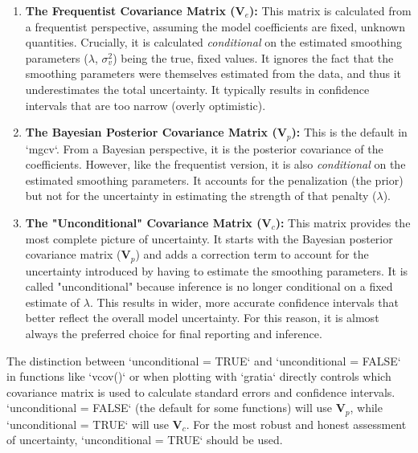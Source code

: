 \documentclass[11pt, a4paper]{article}
\begin{document}
\begin{enumerate}
    \item \textbf{The Frequentist Covariance Matrix ($\mathbf{V}_e$):} This matrix is calculated from a frequentist perspective, assuming the model coefficients are fixed, unknown quantities. Crucially, it is calculated \textit{conditional} on the estimated smoothing parameters ($\lambda$, $\sigma_v^2$) being the true, fixed values. It ignores the fact that the smoothing parameters were themselves estimated from the data, and thus it underestimates the total uncertainty. It typically results in confidence intervals that are too narrow (overly optimistic).

    \item \textbf{The Bayesian Posterior Covariance Matrix ($\mathbf{V}_p$):} This is the default in `mgcv`. From a Bayesian perspective, it is the posterior covariance of the coefficients. However, like the frequentist version, it is also \textit{conditional} on the estimated smoothing parameters. It accounts for the penalization (the prior) but not for the uncertainty in estimating the strength of that penalty ($\lambda$).

    \item \textbf{The "Unconditional" Covariance Matrix ($\mathbf{V}_c$):} This matrix provides the most complete picture of uncertainty. It starts with the Bayesian posterior covariance matrix ($\mathbf{V}_p$) and adds a correction term to account for the uncertainty introduced by having to estimate the smoothing parameters. It is called "unconditional" because inference is no longer conditional on a fixed estimate of $\lambda$. This results in wider, more accurate confidence intervals that better reflect the overall model uncertainty. For this reason, it is almost always the preferred choice for final reporting and inference.
\end{enumerate}
The distinction between `unconditional = TRUE` and `unconditional = FALSE` in functions like `vcov()` or when plotting with `gratia` directly controls which covariance matrix is used to calculate standard errors and confidence intervals. `unconditional = FALSE` (the default for some functions) will use $\mathbf{V}_p$, while `unconditional = TRUE` will use $\mathbf{V}_c$. For the most robust and honest assessment of uncertainty, `unconditional = TRUE` should be used.
\end{document}

